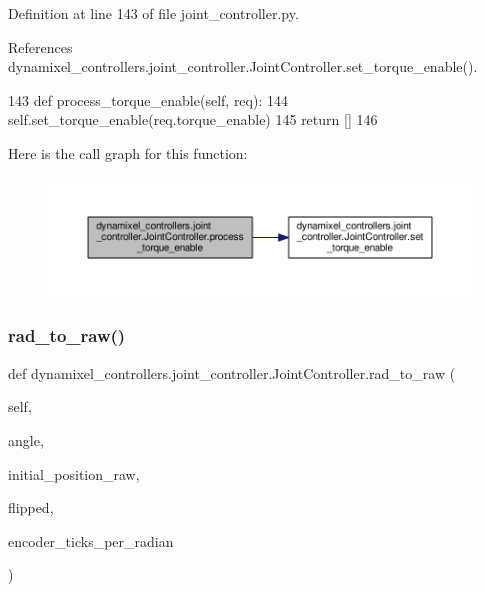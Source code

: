 Definition at line 143 of file joint\+\_\+controller.\+py.



References dynamixel\+\_\+controllers.\+joint\+\_\+controller.\+Joint\+Controller.\+set\+\_\+torque\+\_\+enable().


\begin{DoxyCode}
143     \textcolor{keyword}{def }process\_torque\_enable(self, req):
144         self.set\_torque\_enable(req.torque\_enable)
145         \textcolor{keywordflow}{return} []
146 
\end{DoxyCode}
Here is the call graph for this function\+:
\nopagebreak
\begin{figure}[H]
\begin{center}
\leavevmode
\includegraphics[width=350pt]{d3/dcd/classdynamixel__controllers_1_1joint__controller_1_1_joint_controller_a2181fcf467234ed09e378a93ea5a0553_cgraph}
\end{center}
\end{figure}
\mbox{\label{classdynamixel__controllers_1_1joint__controller_1_1_joint_controller_aea21e76e178029b31cd40b3e0335b621}} 
\subsubsection{\texorpdfstring{rad\+\_\+to\+\_\+raw()}{rad\_to\_raw()}}
{\footnotesize\ttfamily def dynamixel\+\_\+controllers.\+joint\+\_\+controller.\+Joint\+Controller.\+rad\+\_\+to\+\_\+raw (\begin{DoxyParamCaption}\item[{}]{self,  }\item[{}]{angle,  }\item[{}]{initial\+\_\+position\+\_\+raw,  }\item[{}]{flipped,  }\item[{}]{encoder\+\_\+ticks\+\_\+per\+\_\+radian }\end{DoxyParamCaption})\hspace{0.3cm}{\ttfamily [inherited]}}

